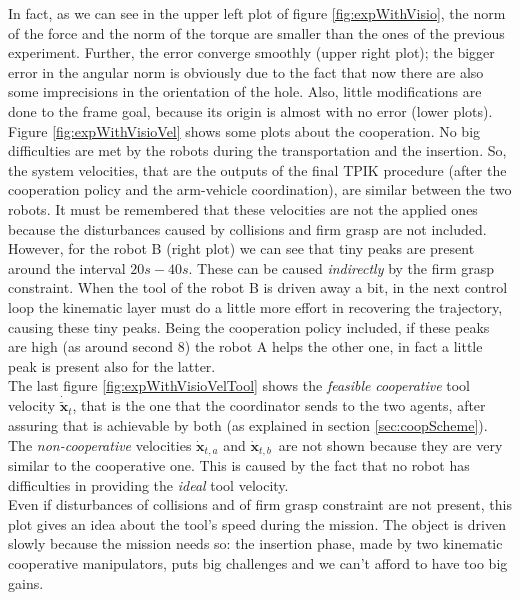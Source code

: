 In fact, as we can see in the upper left plot of figure \ref{fig:expWithVisio}, the norm of the force and the norm of the torque are smaller than the ones of the previous experiment. Further, the error converge smoothly (upper right plot); the bigger error in the angular norm is obviously due to the fact that now there are also some imprecisions in the orientation of the hole. Also, little modifications are done to the frame goal, because its origin is almost with no error (lower plots). \\

Figure \ref{fig:expWithVisioVel} shows some plots about the cooperation. No big difficulties are met by the robots during the transportation and the insertion. So, the system velocities, that are the outputs of the final TPIK procedure (after the cooperation policy and the arm-vehicle coordination), are similar between the two robots. It must be remembered that these velocities are not the applied ones because the disturbances caused by collisions and firm grasp are not included. \\
However, for the robot B (right plot) we can see that tiny peaks are present around the interval $20s - 40s$. These can be caused \textit{indirectly} by the firm grasp constraint. When the tool of the robot B is driven away a bit, in the next control loop the kinematic layer must do a little more effort in recovering the trajectory, causing these tiny peaks. Being the cooperation policy included, if these peaks are high (as around second $8$) the robot A helps the other one, in fact a little peak is present also for the latter.\\

The last figure \ref{fig:expWithVisioVelTool} shows the \textit{feasible} \textit{cooperative} tool velocity $\dot{\tilde{\boldsymbol{x}}}_t$, that is the one that the coordinator sends to the two agents, after assuring that is achievable by both (as explained in section \ref{sec:coopScheme}).\\
The \textit{non-cooperative} velocities $\dot{\boldsymbol{x}}_{t,a}$ and $\dot{\boldsymbol{x}}_{t,b}\,$ are not shown because they are very similar to the cooperative one. This is caused by the fact that no robot has difficulties in providing the \textit{ideal} tool velocity.\\
Even if disturbances of collisions and of firm grasp constraint are not present, this plot gives an idea about the tool's speed during the mission. The object is driven slowly because the mission needs so: the insertion phase, made by two kinematic cooperative manipulators, puts big challenges and we can't afford to have too big gains.\\

